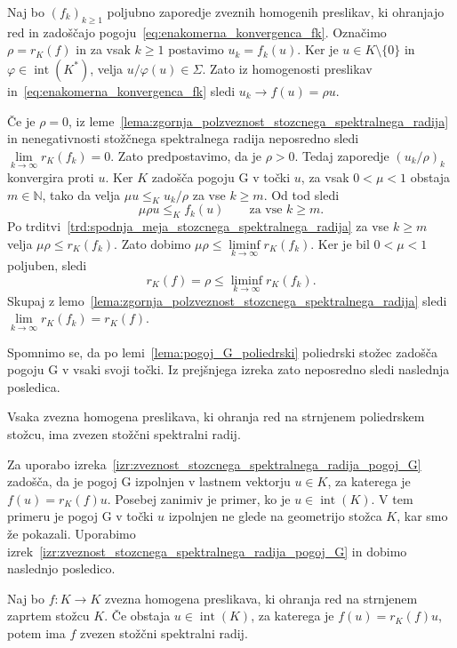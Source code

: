 \documentclass[mat2, tisk]{fmfdelo}
\newcommand{\N}{\mathbb{N}}
\begin{document}
\begin{dokaz}
Naj bo $(f_k)_{k\geq1}$ poljubno zaporedje zveznih homogenih
preslikav, ki ohranjajo red in zadoščajo
pogoju~\eqref{eq:enakomerna_konvergenca_fk}.
Označimo $\rho=r_K(f)$ in za vsak $k\geq1$ postavimo
$u_k=f_k(u)$. Ker je $u\in K\setminus\{0\}$ in
$\varphi\in\operatorname{int}(K^*)$, velja
$u/\varphi(u)\in\Sigma$. Zato iz homogenosti preslikav
in~\eqref{eq:enakomerna_konvergenca_fk} sledi
$u_k\longrightarrow f(u)=\rho u$.

Če je $\rho=0$, iz leme~\ref{lema:zgornja_polzveznost_stozcnega_spektralnega_radija}
in nenegativnosti stožčnega spektralnega radija neposredno
sledi $\lim\limits_{k\to\infty}r_K(f_k)=0$.
Zato predpostavimo, da je $\rho>0$.
Tedaj zaporedje $(u_k/\rho)_k$ konvergira proti $u$.
Ker $K$ zadošča pogoju G v točki $u$, za vsak
$0<\mu<1$ obstaja $m\in\N$, tako da velja
$\mu u\leq_K u_k/\rho$ za vse $k\geq m$.
Od tod sledi
\[
\mu\rho u\leq_K f_k(u)
\qquad\text{za vse }k\geq m.
\]
Po trditvi~\ref{trd:spodnja_meja_stozcnega_spektralnega_radija}
za vse $k\geq m$ velja $\mu\rho\leq r_K(f_k)$.
Zato dobimo
$\mu\rho\leq\liminf\limits_{k\to\infty}r_K(f_k)$.
Ker je bil $0<\mu<1$ poljuben, sledi
\[
r_K(f)=\rho\leq\liminf\limits_{k\to\infty}r_K(f_k).
\]
Skupaj z lemo~\ref{lema:zgornja_polzveznost_stozcnega_spektralnega_radija}
sledi $\lim\limits_{k\to\infty}r_K(f_k)=r_K(f)$.
\end{dokaz}


Spomnimo se, da po lemi~\ref{lema:pogoj_G_poliedrski} poliedrski stožec zadošča pogoju G v vsaki
svoji točki. Iz prejšnjega izreka zato neposredno sledi naslednja
posledica.

\begin{posledica}\label{posledica:zveznost_poliedrski_stozec}
  Vsaka zvezna homogena preslikava, ki ohranja red na strnjenem
  poliedrskem stožcu, ima zvezen stožčni spektralni radij.
\end{posledica}

Za uporabo izreka~\ref{izr:zveznost_stozcnega_spektralnega_radija_pogoj_G}
 zadošča, da je pogoj G izpolnjen v lastnem vektorju
$u\in K$, za katerega je $f(u)=r_K(f)u$. Posebej zanimiv je primer,
ko je $u\in\operatorname{int}(K)$. V tem primeru je pogoj G v točki
$u$ izpolnjen ne glede na geometrijo stožca $K$, kar smo že pokazali.
Uporabimo izrek~\ref{izr:zveznost_stozcnega_spektralnega_radija_pogoj_G} in dobimo 
naslednjo posledico.

\begin{posledica}\label{posledica:zveznost_notranji_lastni_vektor}
  Naj bo $f\colon K\longrightarrow K$ zvezna homogena preslikava, ki
  ohranja red na strnjenem zaprtem stožcu $K$. Če obstaja
  $u\in\operatorname{int}(K)$, za katerega je
  $f(u)=r_K(f)u$, potem ima $f$ zvezen stožčni spektralni radij.
\end{posledica}
\end{document}
